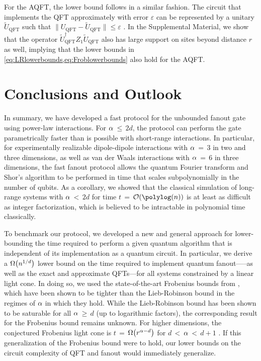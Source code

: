 For the AQFT, the lower bound follows in a similar fashion.
The circuit that implements the QFT approximately with error $\varepsilon$ can be represented by a unitary $\tilde{U}_\mathrm{QFT}$ such that $\|U_\mathrm{QFT}-\tilde {U}_\mathrm{QFT}\|\leq \varepsilon$ \cite{Cleve2000}.
In the Supplemental Material, we show that the operator $\tilde {U}_\mathrm{QFT}^\dag Z_1 \tilde {U}_\mathrm{QFT}$ also has large support on sites beyond distance $r$ as well, implying that the lower bounds in \cref{eq:LRlowerbounds,eq:Froblowerbounds} also hold for the AQFT.

\section{Conclusions and Outlook}
In
summary, we have developed a fast protocol for the unbounded fanout gate using power-law interactions.
For $\alpha$\,$\le$\,$2d$, the protocol can perform the gate parametrically faster than is possible with short-range interactions.
In particular, for experimentally realizable dipole-dipole interactions with $\alpha$\,$=$\,$3$ in two and three dimensions, as well as van der Waals interactions with $\alpha$\,$=$\,$6$ in three dimensions, the fast fanout protocol allows the quantum Fourier transform and Shor's algorithm to be performed in time that scales subpolynomially in the number of qubits.
As a corollary, we showed that the classical simulation of long-range systems with $\alpha$\,$<$\,$2d$ for time $t$\,$=$\,$\O{\polylog(n)}$ is at least as difficult as integer factorization, which is believed to be intractable in polynomial time classically.

To benchmark our protocol, we developed a new and general approach for lower-bounding the time required to perform a given quantum algorithm that is independent of its implementation as a quantum circuit.
In particular, we derive a $\W{n^{1/d}}$ lower bound on the time required to implement quantum fanout—--as well as the exact and approximate QFTs---for all systems constrained by a linear light cone.
In doing so, we used the state-of-the-art Frobenius bounds from \cite{Tran2020hierarchylinearlightcones,Kuwahara2021,Chen2021Frobenius}, which have been shown to be tighter than the Lieb-Robinson bound in the regimes of $\alpha$ in which they hold.
While the Lieb-Robinson bound has been shown to be saturable for all $\alpha$\,$\ge$\,$d$ (up to logarithmic factors), the corresponding result for the Frobenius bound remains unknown.
For higher dimensions, the conjectured Frobenius light cone is $t$\,$=$\,$\W{r^{\alpha-d}}$ for $d$\,$<$\,$\alpha$\,$<$\,$d+1$ \cite{Chen2021Frobenius}.
If this generalization of the Frobenius bound were to hold, our lower bounds on the circuit complexity of QFT and fanout would immediately generalize.

